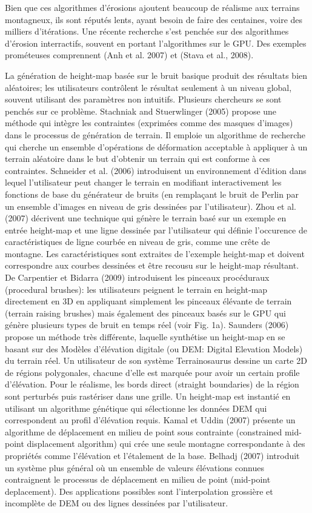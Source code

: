 \documentclass[11pt]{report}
\begin{document}
Bien que ces algorithmes d'érosions ajoutent beaucoup de réalisme aux terrains montagneux, ils sont réputés lents, ayant besoin de faire des centaines, voire des milliers d'itérations. Une récente recherche s'est penchée sur des algorithmes d'érosion interractifs, souvent en portant l'algorithmes sur le GPU. Des exemples prométeuses comprennent (Anh et al. 2007) et (Stava et al., 2008). \newline

La génération de height-map basée sur le bruit basique produit des résultats bien aléatoires; les utilisateurs contrôlent le résultat seulement à un niveau global, souvent utilisant des paramètres non intuitifs. Plusieurs chercheurs se sont penchés sur ce problème. Stachniak and Stuerwlinger (2005) propose une méthode qui intègre les contraintes (exprimées comme des masques d'images) dans le processus de génération de terrain. Il emploie un algorithme de recherche qui cherche un ensemble d'opérations de déformation acceptable à appliquer à un terrain aléatoire dans le but d'obtenir un terrain qui est conforme à ces contraintes. Schneider et al. (2006) introduisent un environnement d'édition dans lequel l'utilisateur peut changer le terrain en modifiant interactivement les fonctions de base du générateur de bruits (en remplaçant le bruit de Perlin par un ensemble d'images en niveau de gris dessinées par l'utilisateur). Zhou et al. (2007) décrivent une technique qui génère le terrain basé sur un exemple en entrée height-map et une ligne dessinée par l'utilisateur qui définie l'occurence de caractéristiques de ligne courbée en niveau de gris, comme une crête de montagne. Les caractéristiques sont extraites de l'exemple height-map et doivent correspondre aux courbes dessinées et être recousu sur le height-map résultant. De Carpentier et Bidarra (2009) introduisent les pinceaux procéduraux (procedural brushes): les utilisateurs peignent le terrain en height-map directement en 3D en appliquant simplement les pinceaux élévante de terrain (terrain raising brushes) mais également des pinceaux basés sur le GPU qui génère plusieurs types de bruit en temps réel (voir Fig. 1a). Saunders (2006) propose un méthode très différente, laquelle synthétise un height-map en se basant sur des Modèles d'élévation  digitale (ou DEM: Digital Elevation Models) du terrain réel. Un utilisateur de son système Terrainosaurus dessine un carte 2D de régions polygonales, chacune d'elle est marquée pour avoir un certain profile d'élévation. Pour le réalisme, les bords direct (straight boundaries) de la région sont perturbés puis rastériser dans une grille. Un height-map est instantié en utilisant un algorithme génétique qui sélectionne les données DEM qui correspondent au profil d'élévation requis. Kamal et Uddin (2007) présente un algorithme de déplacement en milieu de point sous contrainte (constrained mid-point displacement algorithm) qui crée une seule montagne correspondante à des propriétés comme l'élévation et l'étalement de la base. Belhadj (2007) introduit un système plus général où un ensemble de valeurs élévations connues contraignent le processus de déplacement en milieu de point (mid-point deplacement). Des applications possibles sont l'interpolation grossière et incomplète de DEM ou des lignes dessinées par l'utilisateur. 
\end{document}
